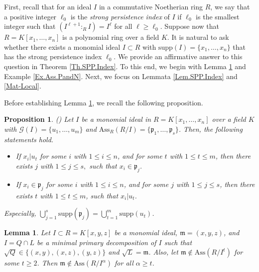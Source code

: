 \documentclass[11pt]{amsart}
\newtheorem{lemma}[theorem]{Lemma}
\newtheorem{proposition}[theorem]{Proposition}
\begin{document}
 First, recall that for an ideal $I$  in  a commutative  Noetherian ring $R$, we  say that a positive integer  $\ell_0$ is the \textit{strong persistence index} of $I$ if $\ell_0$ is the smallest integer such that $(I^{\ell+1}:_RI)=I^{\ell}$ for all  $\ell\geq \ell_0$. Suppose now that $R=K[x_1, \ldots, x_n]$ is a polynomial ring 
 over  a field $K$.  It is natural to ask whether there exists a monomial ideal $I\subset R$ with $\mathrm{supp}(I)=\{x_1, \ldots, x_n\}$  that has the 
 strong persistence index $\ell_{0}$. We provide an affirmative  answer to this question in Theorem \ref{Th.SPP.Index}.  To  this  end, we begin  with 
  Lemma \ref{Lem.Ass.PandN} and     Example \ref{Ex.Ass.PandN}. Next,   we focus on   Lemmata  \ref{Lem.SPP.Index} and \ref{Mat-Local}.  
 
 
 
  Before establishing Lemma \ref{Lem.Ass.PandN}, we recall the following proposition.
 
 \begin{proposition}\label{Pro.supp} (\cite[Proposition 4.2]{NKRT})
Let  $I$ be   a monomial ideal in $R=K[x_1, \ldots, x_n]$ over a field $K$ with $\mathcal{G}(I)=\{u_1, \ldots, u_m\}$ and $\mathrm{Ass}_R(R/I)=\{\mathfrak{p}_1, \ldots, \mathfrak{p}_s\}$. Then, the following statements hold. 
\begin{itemize}
\item[(i)] If $x_i|u_t$ for some $i$ with  $1\leq i \leq n$, and  
for some $t$ with  $1\leq t \leq m$, then there exists $j$ with  $1\leq j \leq s,$ 
such that $x_i\in \mathfrak{p}_j$. 
\item[(ii)] If $x_i\in \mathfrak{p}_j$ for some $i$ with  $1\leq i \leq n$, and  for some $j$ with   $1\leq j \leq s$, then  there exists $t$ with  
 $1\leq t \leq m$, such that  $x_i|u_t$. 
\end{itemize} 
Especially, $\bigcup_{j=1}^s \mathrm{supp}(\mathfrak{p}_j)=\bigcup_{t=1}^m \mathrm{supp}(u_t)$.
\end{proposition}
 
 
 
 
 
 
 
 \begin{lemma} \label{Lem.Ass.PandN}
Let $I\subset R=K[x,y,z]$ be a monomial ideal, $\mathfrak{m}=(x,y,z)$, and $I=Q \cap L$ be a minimal primary decomposition of $I$ such that 
$\sqrt{Q} \in \{(x,y), (x,z), (y,z)\}$ and  $\sqrt{L}=\mathfrak{m}$. Also, let  $\mathfrak{m}\notin \mathrm{Ass}(R/I^t)$ for some $t\geq 2$.  Then $\mathfrak{m}\notin \mathrm{Ass}(R/I^\alpha)$ for all $\alpha \geq t$. 
\end{lemma}
\end{document}
